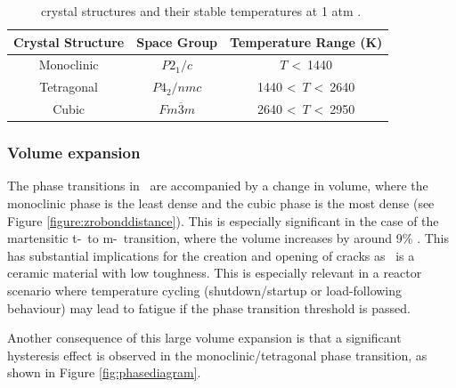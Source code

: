 \begin{table}[htp]
\centering
\onehalfspacing
\caption{\zirconia\ crystal structures and their stable temperatures at 1 atm \cite{Howard1988}.}
\label{table:phases}
\begin{tabular}{ccc}
\hline
{Crystal Structure} & {Space Group}    & {Temperature Range (K)} \\ \hline
\multicolumn{1}{c}{Monoclinic} & \multicolumn{1}{c}{$P2_1/c$} & \multicolumn{1}{c}{$T$ \textless\ 1440}     \\
\multicolumn{1}{c}{Tetragonal} & \multicolumn{1}{c}{$P4_2/nmc$} & \multicolumn{1}{c}{1440 \textless\ $T$ \textless\ 2640}        \\
\multicolumn{1}{c}{Cubic} & \multicolumn{1}{c}{$Fm\overline{3}m$}     & \multicolumn{1}{c}{2640 \textless\ $T$ \textless\ 2950}      \\ \hline
\end{tabular}
\end{table}

\subsubsection*{Volume expansion}

The phase transitions in \zirconia\ are accompanied by a change in volume, where the monoclinic phase is the least dense and the cubic phase is the most dense (see Figure \ref{figure:zrobonddistance}). This is especially significant in the case of the martensitic t-\zirconia\ to m-\zirconia\ transition, where the volume increases by around 9\% \cite{Gupta1977}. This has substantial implications for the creation and opening of cracks as \zirconia\ is a ceramic material with low toughness. This is especially relevant in a reactor scenario where temperature cycling (shutdown/startup or load-following behaviour) may lead to fatigue if the phase transition threshold is passed.

Another consequence of this large volume expansion is that a significant hysteresis effect is observed in the monoclinic/tetragonal phase transition, as shown in Figure \ref{fig:phasediagram}. 

